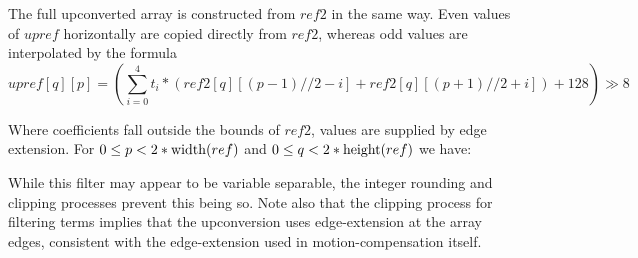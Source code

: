 The full upconverted array is constructed from $ref2$ in the same way.
Even values of $upref$ horizontally are copied directly from $ref2$, whereas
odd values are interpolated by the formula
\[
upref[q][p]=  \left(\sum_{i=0}^{4} t_i *
\left(
 ref2[q][(p-1)//2-i]
+ref2[q][(p+1)//2+i]
\right)+128 \right)\gg8
\]

Where coefficients fall outside the bounds of $ref2$, values
are supplied by edge extension.
For $0\leq p<2*\operatorname{width}(ref)$ and $0\leq q<2*\operatorname{height}(ref)$ we have:

\begin{pseudo*}
\bsELSE
  \bsEND
\bsEND
\end{pseudo*}

\begin{informative}
While this filter may appear to be variable separable, the integer rounding and 
clipping processes prevent this being so. Note also that the clipping process for
filtering terms implies that the upconversion uses edge-extension at the array
edges, consistent with the edge-extension used in motion-compensation itself.
\end{informative}